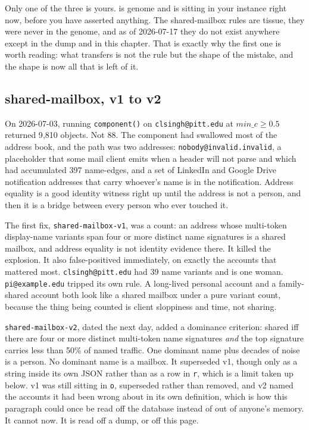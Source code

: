 Only one of the three is yours.  is genome and is sitting in your instance right now, before you have asserted anything. The shared-mailbox rules are tissue, they were never in the genome, and as of 2026-07-17 they do not exist anywhere except in the dump and in this chapter. That is exactly why the first one is worth reading: what transfers is not the rule but the shape of the mistake, and the shape is now all that is left of it.

\subsection{shared-mailbox, v1 to v2}

On 2026-07-03, running \texttt{component()} on \texttt{clsingh@pitt.edu} at $min\_c \geq 0.5$ returned 9{,}810 objects. Not 88. The component had swallowed most of the address book, and the path was two addresses: \texttt{nobody@invalid.invalid}, a placeholder that some mail client emits when a header will not parse and which had accumulated 397 name-edges, and a set of LinkedIn and Google Drive notification addresses that carry whoever's name is in the notification. Address equality is a good identity witness right up until the address is not a person, and then it is a bridge between every person who ever touched it.

The first fix, \texttt{shared-mailbox-v1}, was a count: an address whose multi-token display-name variants span four or more distinct name signatures is a shared mailbox, and address equality is not identity evidence there. It killed the explosion. It also false-positived immediately, on exactly the accounts that mattered most. \texttt{clsingh@pitt.edu} had 39 name variants and is one woman. \texttt{pi@example.edu} tripped its own rule. A long-lived personal account and a family-shared account both look like a shared mailbox under a pure variant count, because the thing being counted is client sloppiness and time, not sharing.

\texttt{shared-mailbox-v2}, dated the next day, added a dominance criterion: shared iff there are four or more distinct multi-token name signatures \emph{and} the top signature carries less than 50\% of named traffic. One dominant name plus decades of noise is a person. No dominant name is a mailbox. It superseded v1, though only as a string inside its own JSON rather than as a row in \texttt{r}, which is a limit taken up below. v1 was still sitting in \texttt{o}, superseded rather than removed, and v2 named the accounts it had been wrong about in its own definition, which is how this paragraph could once be read off the database instead of out of anyone's memory. It cannot now. It is read off a dump, or off this page.


